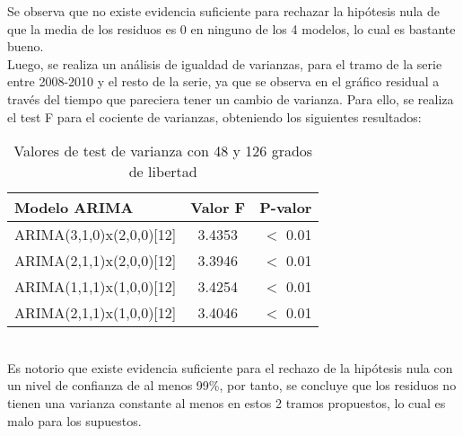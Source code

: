 \documentclass{report}
\begin{document}
Se observa que no existe evidencia suficiente para rechazar la hipótesis nula de que la media de los residuos es 0 en ninguno de los 4 modelos, lo cual es bastante bueno.\\

Luego, se realiza un análisis de igualdad de varianzas, para el tramo de la serie entre 2008-2010 y el resto de la serie, ya que se observa en el gráfico residual a través del tiempo que pareciera tener un cambio de varianza. Para ello, se realiza el test F para el cociente de varianzas, obteniendo los siguientes resultados:\\
\begin{table}[h!]
  \begin{center}
    \label{tab:table1}
    \begin{tabular}{|l|c|r|} 
      \hline
      \textbf{Modelo ARIMA} & \textbf{Valor F} & \textbf{P-valor}\\
      \hline
      ARIMA(3,1,0)x(2,0,0)[12] & 3.4353  & $<$ 0.01 \\
      \hline 
      ARIMA(2,1,1)x(2,0,0)[12] &  3.3946 & $<$ 0.01\\
      \hline
      ARIMA(1,1,1)x(1,0,0)[12] &   3.4254 & $<$ 0.01\\
      \hline
      ARIMA(2,1,1)x(1,0,0)[12] &  3.4046 & $<$ 0.01 \\
      \hline
    \end{tabular}
  \end{center}
  \caption{Valores de test de  varianza con 48 y 126 grados de libertad}
\end{table}\\
Es notorio que existe evidencia suficiente para el rechazo de la hipótesis nula con un nivel de confianza de al menos 99\%, por tanto, se concluye que los residuos no tienen una varianza constante al menos en estos 2 tramos propuestos, lo cual es malo para los supuestos.\\
\end{document}
